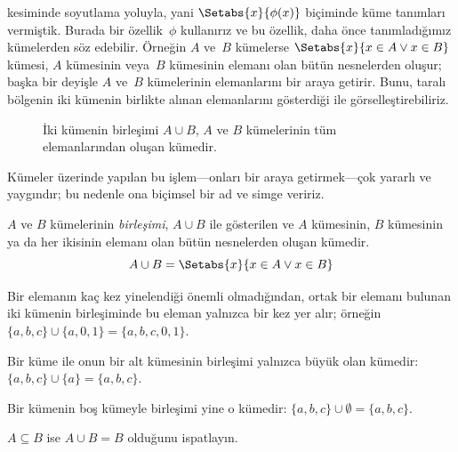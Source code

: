 


\begin{explain}
 kesiminde soyutlama yoluyla, yani
$\Setabs{x}{\phi(x)}$ biçiminde küme tanımları vermiştik. Burada bir
özellik~$\phi$ kullanırız ve bu özellik, daha önce tanımladığımız kümelerden
söz edebilir. Örneğin $A$ ve~$B$ kümelerse
$\Setabs{x}{x \in A \lor x \in B}$ kümesi, $A$ kümesinin veya~$B$ kümesinin elemanı
olan bütün nesnelerden oluşur; başka bir deyişle $A$ ve~$B$ kümelerinin
elemanlarını bir araya getirir. Bunu, taralı bölgenin iki kümenin birlikte
alınan elemanlarını gösterdiği  ile görselleştirebiliriz.

\begin{figure}
  \caption{İki kümenin birleşimi $A \cup B$, $A$ ve $B$ kümelerinin tüm
    elemanlarından oluşan kümedir.}
\end{figure}

Kümeler üzerinde yapılan bu işlem---onları bir araya getirmek---çok yararlı ve
yaygındır; bu nedenle ona biçimsel bir ad ve simge veririz.
\end{explain}

\begin{defn}[Birleşim]
$A$ ve $B$ kümelerinin \emph{birleşimi}, $A \cup B$ ile gösterilen ve $A$
kümesinin, $B$ kümesinin ya da her ikisinin elemanı olan bütün nesnelerden
oluşan kümedir.
\[
A \cup B = \Setabs{x}{x \in A \lor x \in B}
\]
\end{defn}

\begin{ex}
Bir elemanın kaç kez yinelendiği önemli olmadığından, ortak bir elemanı
bulunan iki kümenin birleşiminde bu eleman yalnızca bir kez yer alır; örneğin
$\{ a, b, c\} \cup \{ a, 0, 1\} = \{a, b, c, 0, 1\}$.

Bir küme ile onun bir alt kümesinin birleşimi yalnızca büyük olan kümedir:
$\{a, b, c \} \cup \{a \} = \{a, b, c\}$.

Bir kümenin boş kümeyle birleşimi yine o kümedir:
$\{a, b, c \} \cup \emptyset = \{a, b, c \}$.
\end{ex}

\begin{prob}
$A \subseteq B$ ise $A \cup B = B$ olduğunu ispatlayın.
\end{prob}

